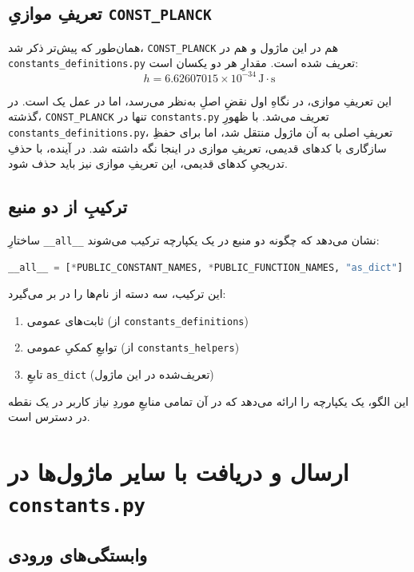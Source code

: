 \subsection{تعریفِ موازیِ \texttt{CONST\_PLANCK}}

همان‌طور که پیش‌تر ذکر شد، \texttt{CONST\_PLANCK} هم در این ماژول و هم در \texttt{constants\_definitions.py} تعریف شده است. مقدارِ هر دو یکسان است:
\begin{equation}
	h = 6.62607015 \times 10^{-34} \, \text{J}\cdot\text{s}
\end{equation}

این تعریفِ موازی، در نگاهِ اول نقضِ اصلِ  به‌نظر می‌رسد، اما در عمل یک  است. در گذشته، \texttt{CONST\_PLANCK} تنها در \texttt{constants.py} تعریف می‌شد. با ظهورِ \texttt{constants\_definitions.py}، تعریفِ اصلی به آن ماژول منتقل شد، اما برای حفظِ سازگاری با کدهای قدیمی، تعریفِ موازی در اینجا نگه داشته شد. در آینده، با حذفِ تدریجیِ کدهای قدیمی، این تعریفِ موازی نیز باید حذف شود.

\subsection{ترکیبِ  از دو منبع}

ساختارِ \texttt{\_\_all\_\_} نشان می‌دهد که چگونه دو منبع در یک  یکپارچه ترکیب می‌شوند:

\begin{lstlisting}[language=Python]
	__all__ = [*PUBLIC_CONSTANT_NAMES, *PUBLIC_FUNCTION_NAMES, "as_dict"]
\end{lstlisting}

این ترکیب، سه دسته از نام‌ها را در بر می‌گیرد:
\begin{enumerate}
	\item ثابت‌های عمومی (از \texttt{constants\_definitions})
	\item توابعِ کمکیِ عمومی (از \texttt{constants\_helpers})
	\item تابعِ \texttt{as\_dict} (تعریف‌شده در این ماژول)
\end{enumerate}

این الگو، یک  یکپارچه را ارائه می‌دهد که در آن تمامی منابعِ موردِ نیاز کاربر در یک نقطه در دسترس است.

\section{ارسال و دریافت با سایر ماژول‌ها در \texttt{constants.py}}

\subsection{وابستگی‌های ورودی}

